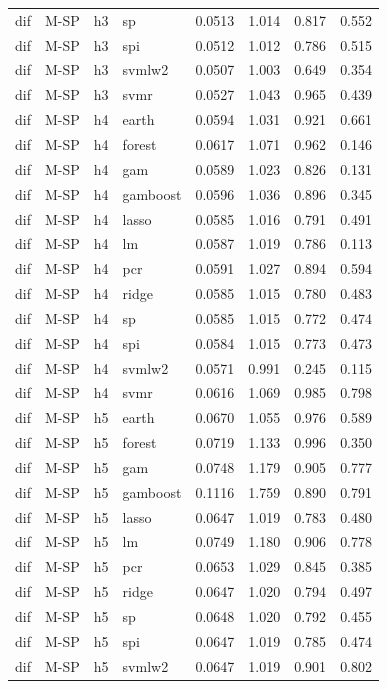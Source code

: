 \begin{ThreePartTable}
\begin{longtable}[t]{llclcccc}
dif & M-SP & h3 & sp & 0.0513 & 1.014 & 0.817 & 0.552\\
dif & M-SP & h3 & spi & 0.0512 & 1.012 & 0.786 & 0.515\\
dif & M-SP & h3 & svmlw2 & 0.0507 & 1.003 & 0.649 & 0.354\\
dif & M-SP & h3 & svmr & 0.0527 & 1.043 & 0.965 & 0.439\\
\addlinespace
dif & M-SP & h4 & earth & 0.0594 & 1.031 & 0.921 & 0.661\\
dif & M-SP & h4 & forest & 0.0617 & 1.071 & 0.962 & 0.146\\
dif & M-SP & h4 & gam & 0.0589 & 1.023 & 0.826 & 0.131\\
dif & M-SP & h4 & gamboost & 0.0596 & 1.036 & 0.896 & 0.345\\
dif & M-SP & h4 & lasso & 0.0585 & 1.016 & 0.791 & 0.491\\
dif & M-SP & h4 & lm & 0.0587 & 1.019 & 0.786 & 0.113\\
dif & M-SP & h4 & pcr & 0.0591 & 1.027 & 0.894 & 0.594\\
dif & M-SP & h4 & ridge & 0.0585 & 1.015 & 0.780 & 0.483\\
dif & M-SP & h4 & sp & 0.0585 & 1.015 & 0.772 & 0.474\\
dif & M-SP & h4 & spi & 0.0584 & 1.015 & 0.773 & 0.473\\
dif & M-SP & h4 & svmlw2 & 0.0571 & 0.991 & 0.245 & 0.115\\
dif & M-SP & h4 & svmr & 0.0616 & 1.069 & 0.985 & 0.798\\
\addlinespace
dif & M-SP & h5 & earth & 0.0670 & 1.055 & 0.976 & 0.589\\
dif & M-SP & h5 & forest & 0.0719 & 1.133 & 0.996 & 0.350\\
dif & M-SP & h5 & gam & 0.0748 & 1.179 & 0.905 & 0.777\\
dif & M-SP & h5 & gamboost & 0.1116 & 1.759 & 0.890 & 0.791\\
dif & M-SP & h5 & lasso & 0.0647 & 1.019 & 0.783 & 0.480\\
dif & M-SP & h5 & lm & 0.0749 & 1.180 & 0.906 & 0.778\\
dif & M-SP & h5 & pcr & 0.0653 & 1.029 & 0.845 & 0.385\\
dif & M-SP & h5 & ridge & 0.0647 & 1.020 & 0.794 & 0.497\\
dif & M-SP & h5 & sp & 0.0648 & 1.020 & 0.792 & 0.455\\
dif & M-SP & h5 & spi & 0.0647 & 1.019 & 0.785 & 0.474\\
dif & M-SP & h5 & svmlw2 & 0.0647 & 1.019 & 0.901 & 0.802\\

\end{longtable}
\end{ThreePartTable}
